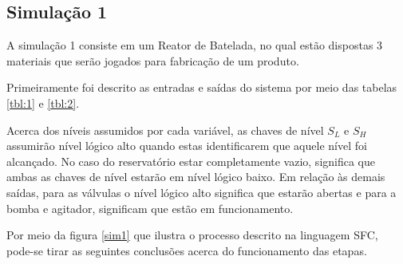 \subsection{Simulação 1}

A simulação 1 consiste em um Reator de Batelada, no qual estão dispostas 3 materiais que serão jogados para fabricação de um produto.

Primeiramente foi descrito as entradas e saídas do sistema por meio das tabelas \ref{tbl:1} e \ref{tbl:2}. 



Acerca dos níveis assumidos por cada variável, as chaves de nível $S_L$ e $S_H$ assumirão nível lógico alto quando estas identificarem que aquele nível foi alcançado. No caso do reservatório estar completamente vazio, significa que ambas as chaves de nível estarão em nível lógico baixo. Em relação às demais saídas, para as válvulas o nível lógico alto significa que estarão abertas e para a bomba e agitador, significam que estão em funcionamento.

Por meio da figura \ref{sim1} que ilustra o processo descrito na linguagem SFC, pode-se tirar as seguintes conclusões acerca do funcionamento das etapas.


